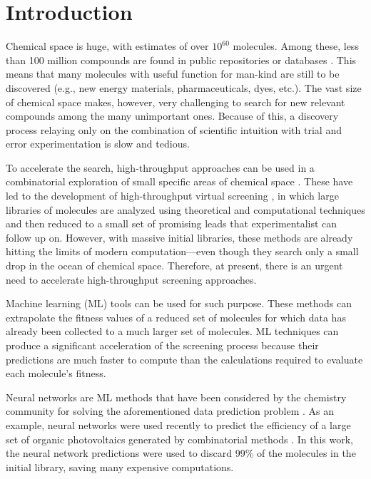 \section{Introduction}

Chemical space is huge, with estimates of over $10^{60}$ molecules. Among
these, less than 100 million compounds are found in public repositories or
databases \cite{Reymond_2012}. This means that many molecules with
useful function for man-kind are still to be discovered (e.g., new energy
materials, pharmaceuticals, dyes, etc.). The vast size of chemical space makes,
however, very challenging to search for new relevant compounds among the many
unimportant ones. Because of this, a discovery process relaying only on
the combination of scientific intuition with trial and error experimentation is slow and tedious.

To accelerate the search, high-throughput approaches can be used in a
combinatorial exploration of small specific areas of chemical space \cite{Rajan_2008}. These have led to the development of
high-throughput virtual screening \cite{Pyzer_Knapp_2015,Halls_2010,Curtarolo_2013,Husch_2015,Subramaniam_2008,Shoichet_2004,Jain_2013}, in which large libraries of molecules are analyzed using
theoretical and computational techniques and then reduced to a small set of
promising leads that experimentalist can follow up on. However, with massive initial libraries, these methods are already
hitting the limits of modern computation---even though they search only a small
drop in the ocean of chemical space. Therefore, at present, there is an urgent
need to accelerate high-throughput screening approaches.

Machine learning (ML) tools can be used for such purpose. These methods can
extrapolate the fitness values of a reduced set of molecules for which data has
already been collected to a much larger set of molecules.  ML techniques can
produce a significant acceleration of the screening process because their
predictions are much faster to compute than the calculations required to
evaluate each molecule's fitness.

Neural networks are ML methods that have been considered by the chemistry
community for solving the aforementioned data prediction problem \cite{Zupan_1991,Burden_1996,Rodemerck_2004,Myint_2012,DuvMacetal15nfp}. As an example, neural networks  were used
recently to predict the efficiency of a large set of organic
photovoltaics generated by combinatorial methods \cite{Pyzer_Knapp_2015a}. In this work, the neural network
predictions were used to discard 99\% of the molecules in the initial
library, saving many expensive computations.

